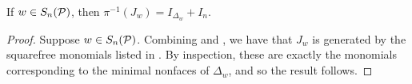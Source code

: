 \begin{lemma}
    \label{lem:defined by inclusions}
    If $w\in S_n(\mathcal{P})$, then $\pi^{-1}(J_w) = I_{\Delta_w}+I_n$.
\end{lemma}
\begin{proof}
    Suppose $w\in S_n(\mathcal{P})$. Combining  and , we have that $J_w$ is generated by the squarefree monomials listed in . 
    By inspection, these are exactly the monomials corresponding to the minimal nonfaces of $\Delta_w$, and so the result follows.
\end{proof}

